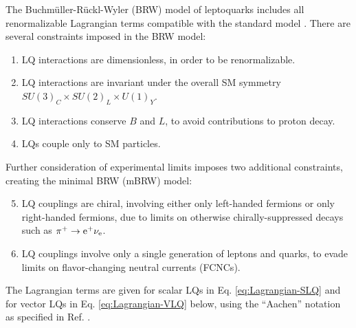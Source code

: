 The Buchm\"{u}ller-R\"{u}ckl-Wyler (BRW) model of leptoquarks includes all renormalizable Lagrangian terms compatible with the standard model \cite{BRW}. There are several constraints imposed in the BRW model:
\begin{enumerate}
\item LQ interactions are dimensionless, in order to be renormalizable.
\item LQ interactions are invariant under the overall SM symmetry \linebreak[4] ${SU(3)_{C} \times SU(2)_{L} \times U(1)_{Y}}$.
\item LQ interactions conserve $B$ and $L$, to avoid contributions to proton decay.
\item LQs couple only to SM particles.
\end{enumerate}
Further consideration of experimental limits imposes two additional constraints, creating the minimal BRW (mBRW) model:
\begin{enumerate}
\setcounter{enumi}{4}
\item LQ couplings are chiral, involving either only left-handed fermions or only right-handed fermions, due to limits on otherwise chirally-suppressed decays such as $\pi^{+} \rightarrow \mathrm{e}^{+} \nu_{\mathrm{e}}$.
\item LQ couplings involve only a single generation of leptons and quarks, to evade limits on flavor-changing neutral currents (FCNCs).
\end{enumerate}
The Lagrangian terms are given for scalar LQs in Eq. \eqref{eq:Lagrangian-SLQ} and for vector LQs in Eq. \eqref{eq:Lagrangian-VLQ} below, using the ``Aachen'' notation as specified in Ref. \cite{ModelIndLQ}.
